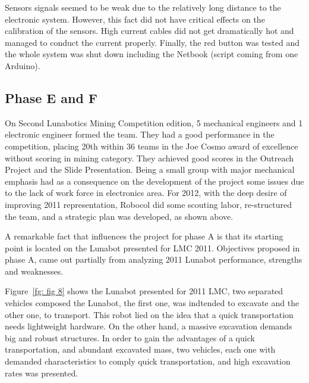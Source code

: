 \documentclass[conference]{IEEEtran}
\begin{document}
Sensors signals seemed to be weak due to the relatively long distance to the electronic system. However, this fact did not have critical effects on the calibration of the sensors. High current cables did not get dramatically hot and managed to conduct the current properly. Finally, the red button was tested and the whole system was shut down including the Netbook (script coming from one Arduino).

\subsection{Phase E and F}

On Second  Lunabotics Mining Competition edition, 5 mechanical engineers and 1 electronic engineer formed the team. They had a good performance in the competition, placing 20th within 36 teams in the Joe Cosmo award of excellence without scoring in mining category. They achieved good scores in the Outreach Project and the Slide Presentation. Being a small group with major mechanical emphasis had as a consequence on the development of the project some issues due to the lack of work force in electronics area. For 2012, with the deep desire of improving 2011 representation, Robocol did some scouting labor, re-structured the team, and a strategic plan was developed, as shown above.

A remarkable fact that influences the project for phase A is that its starting point is located on the Lunabot presented for LMC 2011. Objectives proposed in phase A, came out partially from analyzing 2011 Lunabot performance, strengths and weaknesses. 

Figure~\ref{fg: fig 8} shows the Lunabot presented for 2011 LMC, two separated vehicles composed the Lunabot, the first  one, was indtended to excavate and the other one, to transport. This robot lied on the idea that a quick transportation needs lightweight hardware. On the other hand, a massive excavation demands big and robust structures.  In order to gain the advantages of a quick transportation, and abundant excavated mass, two vehicles, each one with demanded characteristics to comply quick transportation, and high excavation rates was presented.
\end{document}
